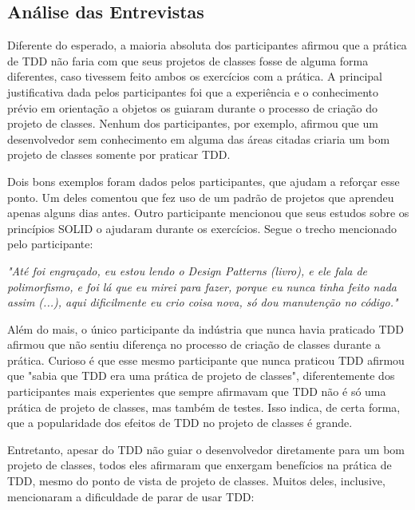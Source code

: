 \documentclass[conference]{IEEEtran}
\begin{document}
\subsection{Análise das Entrevistas}

Diferente do esperado, a maioria absoluta dos participantes afirmou que 
a prática de TDD não faria com que seus projetos de classes fosse de alguma forma diferentes, caso tivessem
feito ambos os exercícios com a prática.
A principal justificativa dada pelos participantes foi que a experiência e o conhecimento prévio
em orientação a objetos os guiaram durante o processo de criação do projeto de classes. Nenhum dos
participantes, por exemplo, afirmou que um desenvolvedor sem conhecimento em alguma das áreas
citadas criaria um bom projeto de classes somente por praticar TDD.

Dois bons exemplos foram dados pelos participantes, que ajudam a reforçar esse ponto. Um deles
comentou que fez uso de um padrão de projetos \cite{gof} que aprendeu apenas alguns dias antes.
Outro participante mencionou que seus estudos sobre os princípios SOLID
o ajudaram durante os exercícios. Segue o trecho mencionado pelo participante:

\begin{framed}
\textit{"Até foi engraçado, eu estou lendo o Design Patterns (livro), e ele fala de polimorfismo, e foi
lá que eu mirei para fazer, porque eu nunca tinha feito nada assim (...), aqui dificilmente eu crio
coisa nova, só dou manutenção no código."}
\end{framed}

Além do mais, o único participante da indústria que nunca havia
praticado TDD afirmou que não sentiu diferença no processo de criação de classes durante
a prática.
Curioso é que esse mesmo participante que nunca praticou TDD afirmou que "sabia que TDD era uma prática de projeto de classes",
diferentemente dos participantes mais experientes que sempre afirmavam que TDD não é só uma prática de projeto de classes,
mas também de testes. Isso indica, de certa forma, que a popularidade dos efeitos de TDD no projeto de classes
é grande.

Entretanto, apesar do TDD não guiar o desenvolvedor diretamente para um bom projeto de classes,
todos eles afirmaram que enxergam benefícios na prática de TDD, mesmo do
ponto de vista de projeto de classes. Muitos deles, inclusive, mencionaram a dificuldade
de parar de usar TDD:
\end{document}
